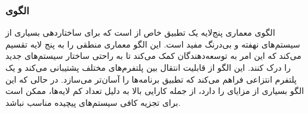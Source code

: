 \subsubsection{الگوی }
\label{arch5LayerSec}
\begin{RTL}
الگوی معماری پنج‌لایه یک تطبیق خاص از  است
که برای ساختاردهی بسیاری از سیستم‌های نهفته و بی‌درنگ
مفید است. این الگو معماری منطقی را به پنج لایه
تقسیم می‌کند که این امر به توسعه‌دهندگان کمک می‌کند
تا به راحتی ساختار سیستم‌های جدید را درک کنند.
این الگو از قابلیت انتقال بین پلتفرم‌های مختلف پشتیبانی
می‌کند و یک پلتفرم انتزاعی فراهم می‌کند که تطبیق برنامه‌ها
را آسان‌تر می‌سازد. در حالی که این الگو بسیاری از
مزایای  را دارد، از جمله کارایی بالا به دلیل تعداد
کم لایه‌ها، ممکن است برای تجزیه کافی سیستم‌های پیچیده مناسب نباشد.
\end{RTL}